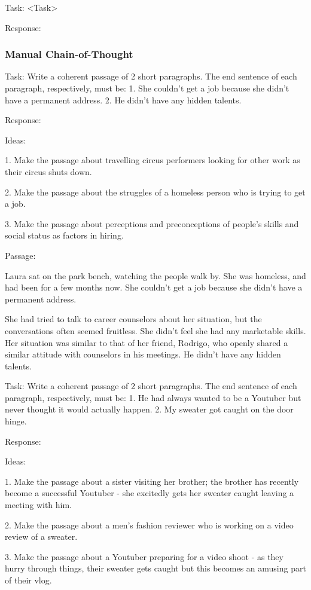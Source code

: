 \documentclass[11pt]{article}
\begin{document}
Task: <Task>

Response: 

\subsubsection*{Manual Chain-of-Thought}

Task: Write a coherent passage of 2 short paragraphs. The end sentence of each paragraph, respectively, must be: 1. She couldn't get a job because she didn't have a permanent address. 2. He didn't have any hidden talents.

Response: 

Ideas:

1. Make the passage about travelling circus performers looking for other work as their circus shuts down.

2. Make the passage about the struggles of a homeless person who is trying to get a job. 

3. Make the passage about perceptions and preconceptions of people's skills and social status as factors in hiring.

Passage: 

Laura sat on the park bench, watching the people walk by. She was homeless, and had been for a few months now. She couldn't get a job because she didn't have a permanent address.

She had tried to talk to career counselors about her situation, but the conversations often seemed fruitless. She didn't feel she had any marketable skills. Her situation was similar to that of her friend, Rodrigo, who openly shared a similar attitude with counselors in his meetings. He didn't have any hidden talents.

Task: Write a coherent passage of 2 short paragraphs. The end sentence of each paragraph, respectively, must be: 1. He had always wanted to be a Youtuber but never thought it would actually happen. 2. My sweater got caught on the door hinge.

Response:

Ideas:

1. Make the passage about a sister visiting her brother; the brother has recently become a successful Youtuber - she excitedly gets her sweater caught leaving a meeting with him.

2. Make the passage about a men's fashion reviewer who is working on a video review of a sweater.

3. Make the passage about a Youtuber preparing for a video shoot - as they hurry through things, their sweater gets caught but this becomes an amusing part of their vlog.
\end{document}
